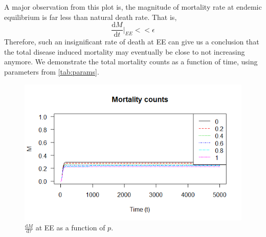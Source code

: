 \documentclass[12pt]{article}
\newcommand\dbyd[2]{\frac{\mathrm d{#1}}{\mathrm d{#2}}}
\begin{document}
A major observation from this plot is, the magnitude of mortality rate at endemic equilibrium is far less than natural death rate. That is,
\begin{equation}
\dbyd{M}{t}|_{EE}<<\epsilon 
\end{equation}
Therefore, such an insignificant rate of death at EE can give us a conclusion that the total disease induced mortality may eventually be close to not increasing anymore. We demonstrate the total mortality counts as a function of time, using parameters from \autoref{tab:params}.
\begin{figure}[H]
  \centering
  \includegraphics[width=1\textwidth]{Figures/Mortality_counts.png}
  \caption{$\dbyd{M}{\tau}$ at EE as a function of $p$.}
\label{fig:dMdt}
\end{figure}
\end{document}
